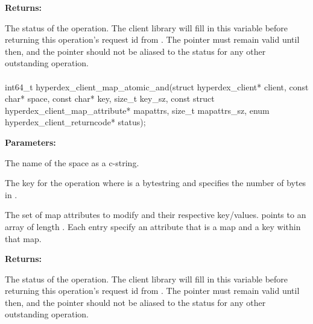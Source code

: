 \noindent\textbf{Returns:}
\begin{description}[labelindent=\widthof{{\code{status}}},leftmargin=*,noitemsep,nolistsep,align=right]
\item[\code{status}] The status of the operation.  The client library will fill in this variable before returning this operation's request id from .  The pointer must remain valid until then, and the pointer should not be aliased to the status for any other outstanding operation.
\end{description}

\paragraph{}
\label{api:c:map_atomic_and}
\begin{ccode}
int64_t hyperdex_client_map_atomic_and(struct hyperdex_client* client,
        const char* space,
        const char* key, size_t key_sz,
        const struct hyperdex_client_map_attribute* mapattrs, size_t mapattrs_sz,
        enum hyperdex_client_returncode* status);
\end{ccode}
\funcdesc 

\noindent\textbf{Parameters:}
\begin{description}[labelindent=\widthof{{\code{mapattrs}, \code{mapattrs\_sz}}},leftmargin=*,noitemsep,nolistsep,align=right]
\item[\code{space}] The name of the space as a c-string.
\item[\code{key}, \code{key\_sz}] The key for the operation where  is a bytestring and  specifies the number of bytes in .
\item[\code{mapattrs}, \code{mapattrs\_sz}] The set of map attributes to modify and their respective key/values.   points to an array of length .  Each entry specify an attribute that is a map and a key within that map.
\end{description}

\noindent\textbf{Returns:}
\begin{description}[labelindent=\widthof{{\code{status}}},leftmargin=*,noitemsep,nolistsep,align=right]
\item[\code{status}] The status of the operation.  The client library will fill in this variable before returning this operation's request id from .  The pointer must remain valid until then, and the pointer should not be aliased to the status for any other outstanding operation.
\end{description}

